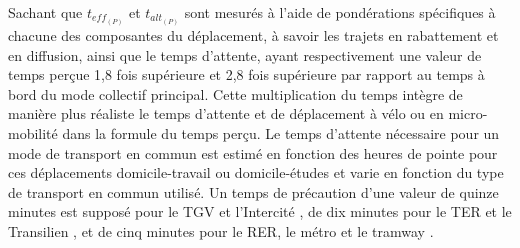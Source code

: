 \begin{refsegment}
Sachant que \(t_{eff_{(P)}}\) et \(t_{alt_{(P)}}\) sont mesurés à l'aide de pondérations spécifiques à chacune des composantes du déplacement, à savoir les trajets en rabattement et en diffusion, ainsi que le temps d'attente, ayant respectivement une valeur de temps perçue 1,8 fois supérieure \textcolor{blue}{\autocite[110]{wardman_review_2001, gleave_transport_1997}} et 2,8 fois supérieure \textcolor{blue}{\autocite[110]{horl_introducing_2021, wardman_review_2001}} par rapport au temps à bord du mode collectif principal. Cette multiplication du temps intègre de manière plus réaliste le temps d'attente et de déplacement à vélo ou en micro-mobilité dans la formule du temps perçu. Le temps d'attente nécessaire pour un mode de transport en commun est estimé en fonction des heures de pointe pour ces déplacements domicile-travail ou domicile-études et varie en fonction du type de transport en commun utilisé. Un temps de précaution d'une valeur de quinze minutes est supposé pour le \acrshort{TGV} et l'Intercité \textcolor{blue}{\autocite[12]{pagliara_high-speed_2012}}, de dix minutes pour le \acrshort{TER} et le Transilien \textcolor{blue}{\autocite[300]{ingvardson_passenger_2018}}, et de cinq minutes pour le \acrshort{RER}, le métro et le tramway \textcolor{blue}{\autocite[300]{hua_comprehensive_2018, ingvardson_passenger_2018}}.%


\end{refsegment}
